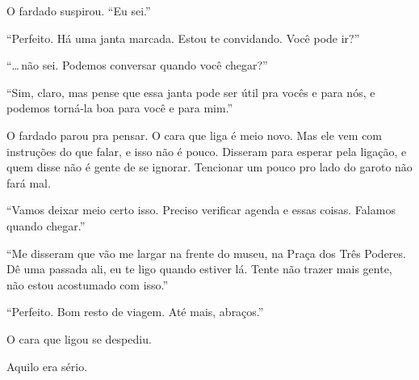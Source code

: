 O fardado suspirou. ``Eu sei.''

``Perfeito. Há uma janta marcada. Estou te convidando. Você pode ir?''

``\ldots\,não sei. Podemos conversar quando você chegar?''

``Sim, claro, mas pense que essa janta pode ser útil pra vocês e para nós, e podemos torná-la boa para você e para mim.''

O fardado parou pra pensar. O cara que liga é meio novo. Mas ele vem com instruções do que falar, e isso não é pouco. Disseram para esperar pela ligação, e quem disse não é gente de se ignorar. Tencionar um pouco pro lado do garoto não fará mal.

``Vamos deixar meio certo isso. Preciso verificar agenda e essas coisas. Falamos quando chegar.''

``Me disseram que vão me largar na frente do museu, na Praça dos Três Poderes. Dê uma passada ali, eu te ligo quando estiver lá. Tente não trazer mais gente, não estou acostumado com isso.''

``Perfeito. Bom resto de viagem. Até mais, abraços.''

O cara que ligou se despediu.

Aquilo era sério.
